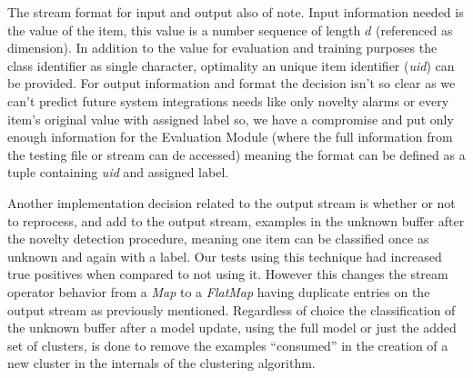 \documentclass[conference]{IEEEtran}
\begin{document}
The stream format for input and output also of note.
Input information needed is the value of the item, this value is a number
sequence of length $d$ (referenced as dimension).
In addition to the value for evaluation and training purposes the class
identifier as single character, optimality an unique item identifier
(\textit{uid}) can be provided.
For output information and format the decision isn't so clear as we can't
predict future system integrations needs like only novelty alarms or every
item's original value with assigned label so, we have a compromise and put only
enough information for the Evaluation Module (where the full information
from the testing file or stream can de accessed) meaning the format can be
defined as a tuple containing \textit{uid} and assigned label.


Another implementation decision related to the output stream is whether or not
to reprocess, and add to the output stream, examples in the unknown buffer after
the novelty detection procedure, meaning one item can be classified once as
unknown and again with a label.
Our tests using this technique had increased true positives when compared to
not using it.
However this changes the stream operator behavior from a \textit{Map} to a
\textit{FlatMap} having duplicate entries on the output stream as previously
mentioned.
Regardless of choice the classification of the unknown buffer after a model
update, using the full model or just the added set of clusters, is done to
remove the examples ``consumed'' in the creation of a new cluster in the internals
of the clustering algorithm.

\end{document}
